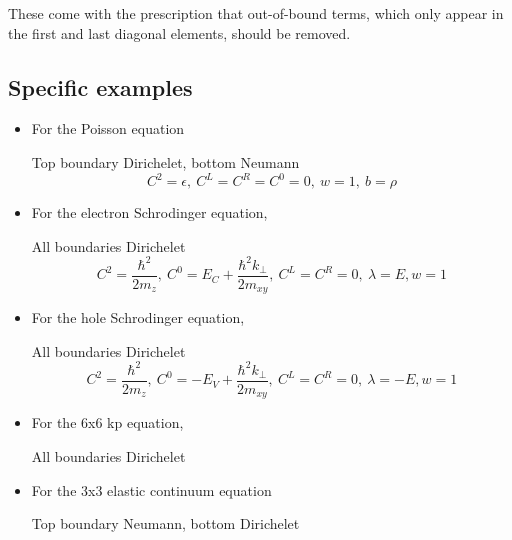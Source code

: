 \documentclass{article}
\begin{document}
These come with the prescription that out-of-bound terms, which only appear in the first and last diagonal elements, should be removed.

\subsection{Specific examples}
\begin{itemize}
  \item For the Poisson equation

    Top boundary Dirichelet, bottom Neumann
    \[C^2=\epsilon,\ C^L=C^R=C^0=0,\ w=1,\ b=\rho\]
  \item For the electron Schrodinger equation,

    All boundaries Dirichelet
    \[C^2=\frac{\hbar^2}{2m_z},\ C^0=E_C+\frac{\hbar^2k_\perp}{2m_{xy}},\ C^L=C^R=0,\ \lambda=E, w=1\]
  \item For the hole Schrodinger equation,

    All boundaries Dirichelet
    \[C^2=\frac{\hbar^2}{2m_z},\ C^0=-E_V+\frac{\hbar^2k_\perp}{2m_{xy}},\ C^L=C^R=0,\ \lambda=-E, w=1\]
  \item For the 6x6 kp equation,

    All boundaries Dirichelet

  \item For the 3x3 elastic continuum equation

    Top boundary Neumann, bottom Dirichelet

\end{itemize}
\end{document}
